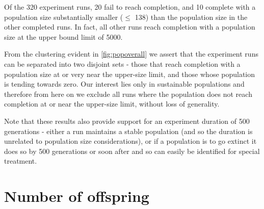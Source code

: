 Of the 320 experiment runs, 20 fail to reach completion, and 10 complete with a population size substantially smaller ($\leq$ 138) than the population size in the other completed runs. In fact, all other runs reach completion with a population size at the upper bound limit of 5000.

From the clustering evident in \ref{fig:popoverall} we assert that the experiment runs can be separated into two disjoint sets - those that reach completion with a population size at or very near the upper-size limit, and those whose population is tending towards zero. Our interest lies only in sustainable populations and therefore from here on we exclude all runs where the population does not reach completion at or near the upper-size limit, without loss of generality.

%


Note that these results also provide support for an experiment duration of 500 generations - either a run maintains a stable population (and so the duration is unrelated to population size considerations), or if a population is to go extinct it does so by 500 generations or soon after and so can easily be identified for special treatment.

\section{Number of offspring}


